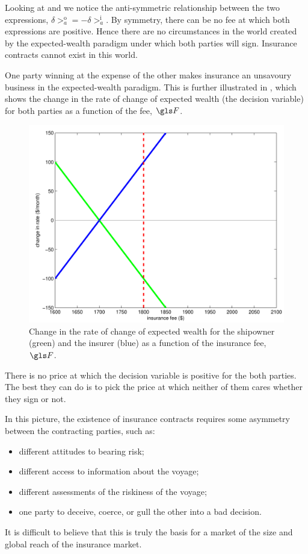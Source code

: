 Looking at  and  we notice the anti-symmetric relationship between
the two expressions,  
$\delta\gt_a^\text{o}=-\delta\gt_a^\text{i}$.
By symmetry, there can be no fee at which both expressions are positive. 
Hence there are no circumstances in the world created by the 
expected-wealth paradigm under which both parties will sign. Insurance
contracts cannot exist in this world.

One party winning at the expense of the other makes insurance an 
unsavoury business in the expected-wealth paradigm. This is further 
illustrated in , which shows the change in the rate of 
change of expected wealth (the decision variable) for both parties 
as a function of the fee, $\F$.
\begin{figure}
\centering
\includegraphics[width=\textwidth]{./chapter_2/figs/ins_lin_cropped.pdf}
\caption{Change in the rate of change of expected wealth for the shipowner (green) and the 
insurer (blue) as a function of the insurance fee, $\F$.}
\end{figure}
There is no price at which the decision variable is positive for the both parties. The best they can 
do is to pick the price at which neither of them cares whether they sign or not.

In this picture, the existence of insurance contracts requires some asymmetry between the contracting parties, such as:
\begin{itemize}
\item different attitudes to bearing risk;
\item different access to information about the voyage;
\item different assessments of the riskiness of the voyage;
\item one party to deceive, coerce, or gull the other into a bad decision.
\end{itemize}
It is difficult to believe that this is truly the basis for a market of the size and global reach of the insurance market.

